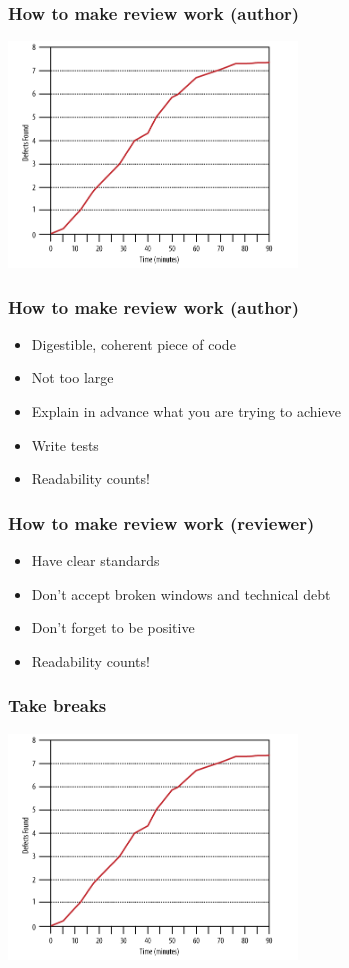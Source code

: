 \documentclass{beamer}
\begin{document}
\begin{frame}
\frametitle{How to make review work (author)}
\includegraphics[height=6cm]{figures/code_review_efficiency.png}
\end{frame}


\begin{frame}
\frametitle{How to make review work (author)}
\begin{itemize}
\item 
 Digestible, coherent piece of code
\item
Not too large
\pause
\item
 Explain in advance what you are trying to achieve
\pause
\item 
 Write tests
\pause
\item
 Readability counts!\footnotemark[1]
\end{itemize}
\end{frame}

\begin{frame}
\frametitle{How to make review work (reviewer)}
\begin{itemize}
\pause
\item 
Have clear standards
\pause 
\item 
Don't accept broken windows and technical debt
\pause
\item 
Don't forget to be positive
\pause
\item 
Readability counts! 
\end{itemize}
\end{frame}

\begin{frame}
\frametitle{Take breaks}
\includegraphics[height=6cm]{figures/review_errors}
\end{frame}
\end{document}
